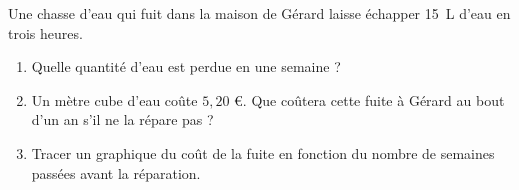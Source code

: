 
\begin{exercice}\label{exosmath-0950}


    Une chasse d'eau qui fuit dans la maison de Gérard laisse échapper \SI{15}{\liter} d'eau en trois heures. 
    \begin{enumerate}
        \item
    Quelle quantité d'eau est perdue en une semaine ?  
\item
    Un mètre cube d'eau coûte $5,20$ €. Que coûtera cette fuite à Gérard au bout d'un an s'il ne la répare pas ?
\item
    Tracer un graphique du coût de la fuite en fonction du nombre de semaines passées avant la réparation.
    \end{enumerate}

\end{exercice}
